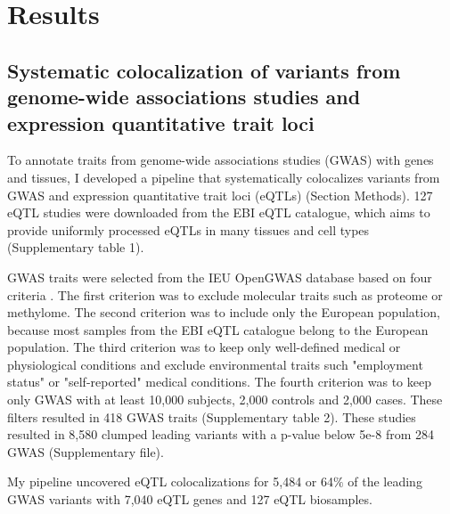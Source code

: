 \section*{Results}\label{s:results}

%
\subsection*{Systematic colocalization of variants from genome-wide associations studies and expression quantitative trait loci}
%

To annotate traits from genome-wide associations studies (GWAS) with genes and tissues,
I developed a pipeline that systematically colocalizes variants from GWAS and expression quantitative trait loci (eQTLs) (Section Methods).
%
127 eQTL studies were downloaded from the EBI eQTL catalogue, which aims to provide uniformly processed eQTLs in many
tissues and cell types \citep{2021.Alasoo.Kerimov} (Supplementary table 1).

GWAS traits were selected from the IEU OpenGWAS database based on four criteria \citep{2018.Parkinson.Buniello}.
%
The first criterion was to exclude molecular traits such as proteome or methylome.
%	
The second criterion was to include only the European population, because most
samples from the EBI eQTL catalogue belong to the European population.
%
The third criterion was to keep only well-defined medical or physiological
conditions and exclude environmental traits such "employment status" or "self-reported" medical conditions.
%
The fourth criterion was to keep only GWAS with at least 10,000 subjects, 2,000 controls and 2,000 cases.
%
These filters resulted in 418 GWAS traits (Supplementary table 2).
%
These studies resulted in 8,580 clumped leading variants with a p-value below 5e-8 from 284 GWAS (Supplementary file).

My pipeline uncovered eQTL colocalizations for 5,484 or 64$\%$ of the leading GWAS variants with 7,040 eQTL genes and 127 eQTL biosamples.

